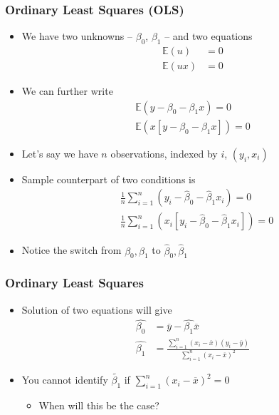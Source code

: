 \documentclass{beamer}
\theoremstyle{plain}
\begin{document}
\begin{frame}
	\frametitle{Ordinary Least Squares (OLS)}
	\begin{itemize}
		\item We have two unknowns -- $\beta_0$, $\beta_1$ -- and two equations
		\begin{align*}
			\mathbb E(u) &=0\\
			\mathbb E(ux) &=0
		\end{align*}
		\item We can further write
		\begin{align*}
			\mathbb E(y - \beta_0 -\beta_1 x) =0\\
			\mathbb E(x[y - \beta_0 -\beta_1 x]) =0
		\end{align*}
		\item Let's say we have $n$ observations, indexed by $i$, $(y_i,x_i)$
		\item Sample counterpart of two conditions is
		\begin{align*}
			&\frac{1}{n}\sum_{i=1}^n\left(y_i - \widehat\beta_0 - \widehat \beta_1 x_i \right)=0\\
			&\frac{1}{n}\sum_{i=1}^n\left(x_i\left[y_i - \widehat\beta_0 - \widehat \beta_1 x_i\right] \right)=0
		\end{align*}
		\item Notice the switch from $\beta_0, \beta_1$ to $\widehat \beta_0, \widehat \beta_1$
	\end{itemize}
\end{frame}

\begin{frame}
	\frametitle{Ordinary Least Squares}
	\begin{itemize}
		\item Solution of two equations will give
		\begin{align*}
			\widehat{\beta_0} &= \overline y - \widehat{\beta_1} \overline x\\
			\widehat{\beta_1} &= \frac{\sum_{i=1}^n (x_i - \overline x) (y_i - \overline y)}{\sum_{i=1}^n(x_i -\overline{x})^2} 
		\end{align*}
		\item You cannot identify $\widetilde{\beta_1}$ if $\sum_{i=1}^n(x_i -\overline{x})^2 = 0$
			\begin{itemize}
				\item When will this be the case?
			\end{itemize}
	\end{itemize}
\end{frame}
\end{document}
